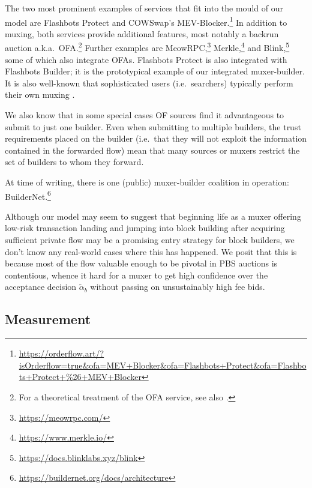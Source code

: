 The two most prominent examples of services that fit into the mould of our model are Flashbots Protect and COWSwap's MEV-Blocker.\footnote{\url{https://orderflow.art/?isOrderflow=true&ofa=MEV+Blocker&ofa=Flashbots+Protect\&ofa=Flashbots+Protect+\%26+MEV+Blocker}}
%
In addition to muxing, both services provide additional features, most notably a backrun auction a.k.a.~OFA.\footnote{For a theoretical treatment of the OFA service, see also \cite{macpherson2024backrun}.}
%
Further examples are MeowRPC,\footnote{\url{https://meowrpc.com/}} Merkle,\footnote{\url{https://www.merkle.io/}} and Blink,\footnote{\url{https://docs.blinklabs.xyz/blink}} some of which also integrate OFAs.
%
Flashbots Protect is also integrated with Flashbots Builder; it is the prototypical example of our integrated muxer-builder.
%
It is also well-known that sophisticated users (i.e.~searchers) typically perform their own muxing \cite{titan2023builder}.

We also know \cite{yang2024decentralization} that in some special cases OF sources find it advantageous to submit to just one builder. 
%
Even when submitting to multiple builders, the trust requirements placed on the builder (i.e.~that they will not exploit the information contained in the forwarded flow) mean that many sources or muxers restrict the set of builders to whom they forward.

At time of writing, there is one (public) muxer-builder coalition in operation: BuilderNet.\footnote{\url{https://buildernet.org/docs/architecture}}

Although our model may seem to suggest that beginning life as a muxer offering low-risk transaction landing and jumping into block building after acquiring sufficient private flow may be a promising entry strategy for block builders, we don't know any real-world cases where this has happened.
%
We posit that this is because most of the flow valuable enough to be pivotal in PBS auctions is contentious, whence it hard for a muxer to get high confidence over the acceptance decision $\tilde\alpha_b$ without passing on unsustainably high fee bids.


\subsection*{Measurement}

